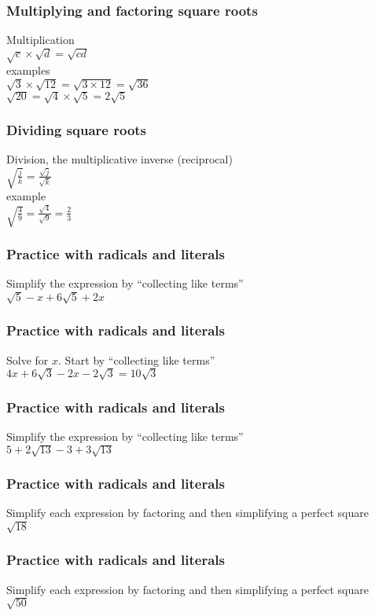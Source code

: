 \documentclass{beamer}
\begin{document}
\frame
{
  \frametitle{Multiplying and factoring square roots}
    \Large{
    Multiplication\\
    $\sqrt{c} \times \sqrt{d}=\sqrt{cd}$\\[0.5cm]
    examples\\
    $\sqrt{3} \times \sqrt{12}=\sqrt{3 \times 12}= \sqrt{36}$\\[2cm]
    $\sqrt{20}=\sqrt{4} \times \sqrt{5}=2\sqrt{5}$\\[1.5cm]
}
}

\frame
{
  \frametitle{Dividing square roots}
    \Large{
    Division, the multiplicative inverse (reciprocal)\\
    $\displaystyle \sqrt{\frac{j}{k}}= \frac{\sqrt{j}}{\sqrt{k}}$\\[0.5cm]
    example\\[0.5cm]
    $\displaystyle \sqrt{\frac{4}{9}}= \frac{\sqrt{4}}{\sqrt{9}}= \frac{2}{3}$\\[2.5cm]
}
}

\frame
{
  \frametitle{Practice with radicals and literals}
  \Large{
  Simplify the expression by ``collecting like terms''\\[0.5cm]
      $\sqrt{5}-x+6\sqrt{5}+2x$ \vspace{4cm}
  }
}

\frame
{
  \frametitle{Practice with radicals and literals}
  \Large{
  Solve for $x$. Start by ``collecting like terms''\\[0.5cm]
      $4x+6\sqrt{3}-2x-2\sqrt{3}=10\sqrt{3}$ \vspace{5cm}
  }
}

\frame
{
  \frametitle{Practice with radicals and literals}
  \Large{
  Simplify the expression by ``collecting like terms''\\[0.5cm]
      $5+2\sqrt{13}-3+3\sqrt{13}$ \vspace{4cm}
  }
}

\frame
{
  \frametitle{Practice with radicals and literals}
  \Large{
    Simplify each expression by factoring and then simplifying a perfect square\\[0.5cm]
      $\sqrt{18}$ \vspace{4cm}
  }
}

\frame
{
  \frametitle{Practice with radicals and literals}
  \Large{
    Simplify each expression by factoring and then simplifying a perfect square\\[0.5cm]
      $\sqrt{50}$ \vspace{4cm}
  }
}
\end{document}
